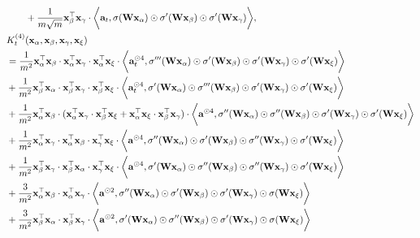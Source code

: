\begin{proposition}
\begin{align}
		\label{eq: K_3_two_layer}
		& \qquad + \frac{1}{m\sqrt{m}}\rvx_\beta^\top\rvx_\gamma \cdot \bigg\la\rva_t, \sigma(\rmW \rvx_\alpha)\odot \sigma'(\rmW \rvx_\beta)\odot \sigma'(\rmW \rvx_\gamma) \bigg\ra ,\\
		& \KKKK_t(\rvx_\alpha,\rvx_\beta,\rvx_\gamma,\rvx_\xi)\nonumber\\
		& =  \frac{1}{m^2}\rvx_\alpha^\top\rvx_\beta \cdot \rvx_\alpha^\top\rvx_\gamma \cdot\rvx_\alpha^\top\rvx_\xi \cdot \bigg\la\rva_t^{\odot 4}, \sigma'''(\rmW \rvx_\alpha) \odot \sigma'(\rmW \rvx_\beta) \odot \sigma'(\rmW  \rvx_\gamma) \odot \sigma'(\rmW \rvx_\xi) \bigg\ra \nonumber\\
		& + \frac{1}{m^2}\rvx_\beta^\top\rvx_\alpha \cdot\rvx_\beta^\top\rvx_\gamma \cdot\rvx_\beta^\top\rvx_\xi \cdot \bigg\la\rva_t^{\odot 4}, \sigma'(\rmW \rvx_\alpha) \odot \sigma'''(\rmW \rvx_\beta) \odot \sigma'(\rmW \rvx_\gamma) \odot \sigma'(\rmW \rvx_\xi) \bigg\ra \nonumber \\
		& + \frac{1}{m^2}\rvx_\alpha^\top\rvx_\beta \cdot (\rvx_\alpha^\top\rvx_\gamma \cdot\rvx_\beta^\top\rvx_\xi +\rvx_\alpha^\top\rvx_\xi \cdot\rvx_\beta^\top\rvx_\gamma) \cdot \bigg\la\rva^{\odot 4}, \sigma''(\rmW \rvx_\alpha) \odot \sigma''(\rmW \rvx_\beta) \odot \sigma'(\rmW \rvx_\gamma) \odot \sigma'(\rmW \rvx_\xi)\bigg\ra \nonumber \\
		& + \frac{1}{m^2}\rvx_\alpha^\top\rvx_\gamma \cdot\rvx_\alpha^\top\rvx_\beta \cdot\rvx_\gamma^\top\rvx_\xi \cdot \bigg\la\rva^{\odot 4} , \sigma''(\rmW \rvx_\alpha) \odot \sigma'(\rmW \rvx_\beta) \odot \sigma''(\rmW \rvx_\gamma) \odot \sigma'(\rmW \rvx_\xi) \bigg\ra \nonumber \\
		& + \frac{1}{m^2}\rvx_\beta^\top\rvx_\gamma \cdot\rvx_\beta^\top\rvx_\alpha  \cdot\rvx_\gamma^\top\rvx_\xi \cdot \bigg\la\rva^{\odot 4}, \sigma'(\rmW \rvx_\alpha) \odot \sigma''(\rmW \rvx_\beta) \odot \sigma''(\rmW \rvx_\gamma) \odot \sigma'(\rmW \rvx_\xi) \bigg\ra \nonumber \\
		& + \frac{3}{m^2}\rvx_\alpha^\top\rvx_\beta \cdot\rvx_\alpha^\top\rvx_\gamma \cdot \bigg\la\rva^{\odot 2},  \sigma''(\rmW \rvx_\alpha) \odot \sigma'(\rmW \rvx_\beta) \odot \sigma'(\rmW \rvx_\gamma) \odot \sigma(\rmW \rvx_\xi)  \bigg\ra \nonumber \\
		& + \frac{3}{m^2}\rvx_\beta^\top\rvx_\alpha \cdot\rvx_\beta^\top\rvx_\gamma \cdot \bigg\la\rva^{\odot 2},  \sigma'(\rmW \rvx_\alpha) \odot \sigma''(\rmW \rvx_\beta) \odot \sigma'(\rmW \rvx_\gamma) \odot \sigma(\rmW \rvx_\xi)  \bigg\ra \nonumber \\

\end{align}
\end{proposition}

